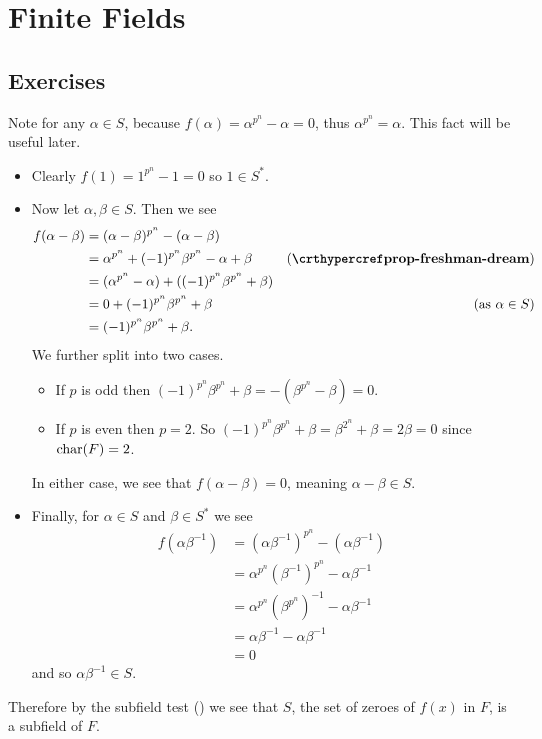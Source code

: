 \section{Finite Fields}
\subsection*{Exercises}
\begin{questions}
    \item Note for any $\alpha \in S$, because $f(\alpha) = \alpha^{p^n} - \alpha = 0$, thus $\alpha^{p^n} = \alpha$. This fact will be useful later.
    \begin{itemize}
        \item Clearly $f(1) = 1^{p^n} - 1 = 0$ so $1 \in S^\ast$.

        \item Now let $\alpha,\beta \in S$. Then we see
        \begin{align*}
            f(\alpha - \beta) &= (\alpha-\beta)^{p^n} - (\alpha - \beta)\\
            &= \alpha^{p^n} + (-1)^{p^n}\beta^{p^n} - \alpha + \beta & (\myref{prop-freshman-dream})\\
            &= (\alpha^{p^n} - \alpha) + ((-1)^{p^n}\beta^{p^n} + \beta)\\
            &= 0 + (-1)^{p^n}\beta^{p^n} + \beta & (\text{as } \alpha \in S)\\
            &= (-1)^{p^n}\beta^{p^n} + \beta.
        \end{align*}
        We further split into two cases.
        \begin{itemize}
            \item If $p$ is odd then $(-1)^{p^n}\beta^{p^n} + \beta = -(\beta^{p^n} - \beta) = 0$.
            \item If $p$ is even then $p = 2$. So $(-1)^{p^n}\beta^{p^n} + \beta = \beta^{2^n} + \beta = 2\beta = 0$ since $\mathrm{char}(F) = 2$.
        \end{itemize}
        In either case, we see that $f(\alpha-\beta) = 0$, meaning $\alpha - \beta \in S$.

        \item Finally, for $\alpha \in S$ and $\beta \in S^\ast$ we see
        \begin{align*}
            f(\alpha\beta^{-1}) &= (\alpha\beta^{-1})^{p^n} - (\alpha\beta^{-1})\\
            &= \alpha^{p^n}\left(\beta^{-1}\right)^{p^n} - \alpha\beta^{-1}\\
            &= \alpha^{p^n}\left(\beta^{p^n}\right)^{-1} - \alpha\beta^{-1}\\
            &= \alpha\beta^{-1} - \alpha\beta^{-1}\\
            &= 0
        \end{align*}
        and so $\alpha\beta^{-1} \in S$.
    \end{itemize}
    Therefore by the subfield test () we see that $S$, the set of zeroes of $f(x)$ in $F$, is a subfield of $F$.


\end{questions}
